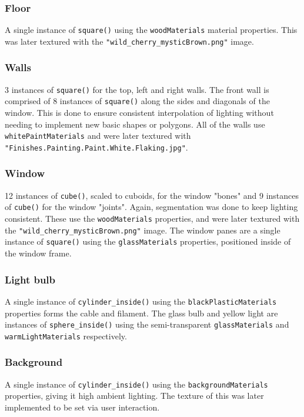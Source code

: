 \documentclass{article}
\begin{document}
		\subsubsection{Floor}
		A single instance of \texttt{square()} using the \texttt{woodMaterials} material properties.
		This was later textured with the \texttt{"wild\_cherry\_mysticBrown.png"} image.

		\subsubsection{Walls}
		3 instances of \texttt{square()} for the top, left and right walls. The front wall is comprised of 8
		instances of \texttt{square()} along the sides and diagonals of the window. This is done to
		ensure consistent interpolation of lighting without needing to implement new basic shapes or polygons.
		All of the walls use \texttt{whitePaintMaterials} and were later textured
		with \texttt{"Finishes.Painting.Paint.White.Flaking.jpg"}.

		\subsubsection{Window}
		12 instances of \texttt{cube()}, scaled to cuboids, for the window "bones" and 9 instances of
		\texttt{cube()} for the window "joints". Again, segmentation was done to keep lighting
		consistent. These use the \texttt{woodMaterials} properties, and were later textured with
		the \texttt{"wild\_cherry\_mysticBrown.png"} image. The window panes are a single instance of
		\texttt{square()} using the \texttt{glassMaterials}
		properties, positioned inside of the window frame.

		\subsubsection{Light bulb}
		A single instance of \texttt{cylinder\_inside()} using the \texttt{blackPlasticMaterials}
		properties forms the cable and filament. The glass bulb and yellow light are instances of
		\texttt{sphere\_inside()} using the semi-transparent \texttt{glassMaterials} and
		\texttt{warmLightMaterials} respectively.

		\subsubsection{Background}
		A single instance of \texttt{cylinder\_inside()} using the \texttt{backgroundMaterials} properties,
		giving it high ambient lighting. The texture of this was later implemented to be set via user
		interaction.
\end{document}
